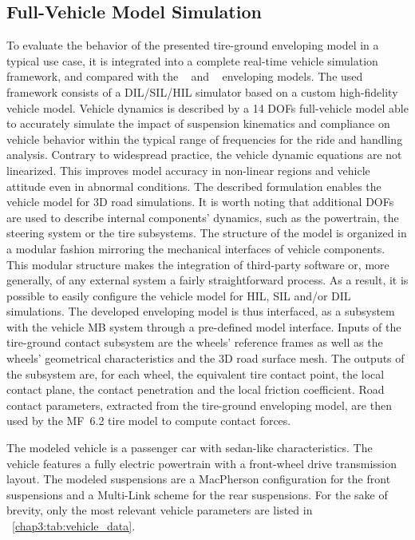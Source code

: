 
\subsection{Full-Vehicle Model Simulation}
\label{chap3:Simulator}

To evaluate the behavior of the presented tire-ground enveloping model in a typical use case, it is integrated into a complete real-time vehicle simulation framework, and compared with the \Swift{}~\cite{schmeitz2004semiempirical} and \TMEasy~\cite{rill2013tmeasy, rill2018sophisticated}{} enveloping models. The used framework consists of a DIL/SIL/HIL simulator based on a custom high-fidelity vehicle model. Vehicle dynamics is described by a 14 \acp{DOF} full-vehicle model able to accurately simulate the impact of suspension kinematics and compliance on vehicle behavior within the typical range of frequencies for the ride and handling analysis. Contrary to widespread practice, the vehicle dynamic equations are not linearized. This improves model accuracy in non-linear regions and vehicle attitude even in abnormal conditions. The described formulation enables the vehicle model for 3D road simulations. It is worth noting that additional \acp{DOF} are used to describe internal components' dynamics, such as the powertrain, the steering system or the tire subsystems. The structure of the model is organized in a modular fashion mirroring the mechanical interfaces of vehicle components. This modular structure makes the integration of third-party software or, more generally, of any external system a fairly straightforward process. As a result, it is possible to easily configure the vehicle model for HIL, SIL and/or DIL simulations. The developed enveloping model is thus interfaced, as a subsystem with the vehicle MB system through a pre-defined model interface. Inputs of the tire-ground contact subsystem are the wheels' reference frames as well as the wheels' geometrical characteristics and the 3D road surface mesh. The outputs of the subsystem are, for each wheel, the equivalent tire contact point, the local contact plane, the contact penetration and the local friction coefficient. Road contact parameters, extracted from the tire-ground enveloping model, are then used by the \ac{MF}~6.2 tire model to compute contact forces.

The modeled vehicle is a passenger car with sedan-like characteristics. The vehicle features a fully electric powertrain with a front-wheel drive transmission layout. The modeled suspensions are a MacPherson configuration for the front suspensions and a Multi-Link scheme for the rear suspensions. For the sake of brevity, only the most relevant vehicle parameters are listed in \tablename~\ref{chap3:tab:vehicle_data}.

